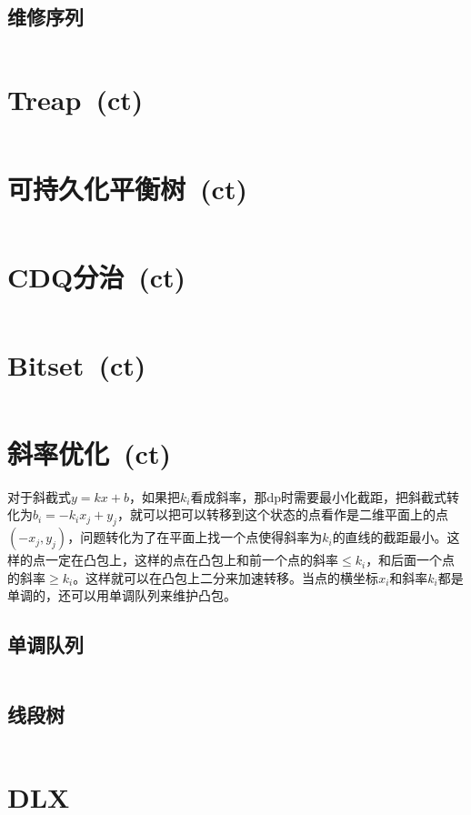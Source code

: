 	\subsection*{维修序列}
		\inputminted{cpp}{DataStructure/splay_arr.cpp}
\section{Treap\ \small(ct)}
	\inputminted{cpp}{DataStructure/treap.cpp}
\section{可持久化平衡树\ \small(ct)}
	\inputminted{cpp}{DataStructure/functional_treap.cpp}
\section{CDQ分治\ \small(ct)}
	\inputminted{cpp}{DataStructure/cdq_divide.cpp}
\section{Bitset\ \small(ct)}
	\inputminted{cpp}{DataStructure/bitset.cpp}
\section{斜率优化\ \small(ct)}
	对于斜截式$ y = k x + b $，如果把$ k_i $看成斜率，那dp时需要最小化截距，把斜截式转化为$ b_i = - k_i x_j + y_j $，就可以把可以转移到这个状态的点看作是二维平面上的点$ (- x_j, y_j) $，问题转化为了在平面上找一个点使得斜率为$ k_i $的直线的截距最小。这样的点一定在凸包上，这样的点在凸包上和前一个点的斜率$ \leq k_i$，和后面一个点的斜率$ \geq k_i $。这样就可以在凸包上二分来加速转移。当点的横坐标$ x_i $和斜率$ k_i $都是单调的，还可以用单调队列来维护凸包。
	\subsection*{单调队列}
		\inputminted{cpp}{DataStructure/slope_optimize_queue.cpp}
	\subsection*{线段树}
		\inputminted{cpp}{DataStructure/slope_optimize_segment.cpp}
\section{DLX}
